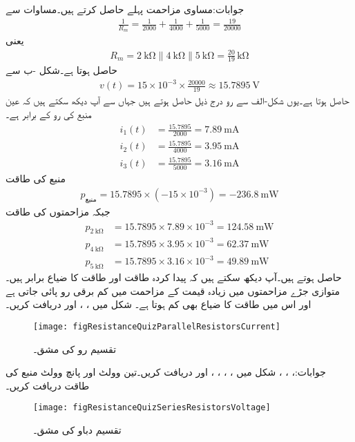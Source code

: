 جوابات:مساوی مزاحمت پہلے حاصل کرتے ہیں۔مساوات  سے
\begin{align*}
\frac{1}{R_m}=\frac{1}{2000}+\frac{1}{4000}+\frac{1}{5000}=\frac{19}{20000}
\end{align*}
یعنی
\begin{align*}
R_m=\SI{2}{\kilo\ohm} \parallel \SI{4}{\kilo\ohm} \parallel \SI{5}{\kilo\ohm}=\frac{20}{19} \, \si{\kilo\ohm}
\end{align*}
حاصل ہوتا ہے۔شکل -ب سے 
\begin{align*}
v(t)=15 \times 10^{-3} \times \frac{20000}{19} \approx \SI{15.7895}{\volt}
\end{align*}
حاصل ہوتا ہے۔یوں شکل-الف سے رو درج ذیل حاصل ہوتے ہیں جہاں سے آپ دیکھ سکتے ہیں کہ  عین منبع کی رو کے برابر ہے۔
\begin{align*}
i_1(t)&=\frac{15.7895}{2000}=\SI{7.89}{\milli\ampere}\\
i_2(t)&=\frac{15.7895}{4000}=\SI{3.95}{\milli\ampere}\\
i_3(t)&=\frac{15.7895}{5000}=\SI{3.16}{\milli\ampere}
\end{align*}
منبع کی طاقت
\begin{align*}
p_{\text{منبع}}=15.7895 \times (-15\times 10^{-3})=\SI{-236.8}{\milli\watt}
\end{align*}
جبکہ مزاحمتوں کی طاقت
\begin{align*}
p_{\SI{2}{\kilo\ohm}}&=15.7895\times 7.89\times 10^{-3}=\SI{124.58}{\milli\watt}\\
p_{\SI{4}{\kilo\ohm}}&=15.7895\times 3.95\times 10^{-3}=\SI{62.37}{\milli\watt}\\
p_{\SI{5}{\kilo\ohm}}&=15.7895\times 3.16\times 10^{-3}=\SI{49.89}{\milli\watt}
\end{align*}
حاصل ہوتے ہیں۔آپ دیکھ سکتے ہیں کہ پیدا کردہ طاقت اور طاقت کا ضیاع برابر ہیں۔متوازی جڑے مزاحمتوں میں زیادہ قیمت کے مزاحمت میں کم برقی رو پائی جاتی ہے اور اس میں طاقت کا ضیاع بھی کم ہوتا ہے۔
\FloatBarrier
شکل  میں ، ،  اور  دریافت کریں۔
\begin{figure}
\centering
\texttt{[image: figResistanceQuizParallelResistorsCurrent]}
\caption{تقسیم رو کی مشق۔}
\label{مشق_مزاحمتی_تقسیم_رو_مشق}
\end{figure}

جوابات:، ، ، 
\FloatBarrier
شکل  میں ، ، ، ،  اور  دریافت کریں۔تین وولٹ اور پانچ وولٹ منبع کی طاقت دریافت کریں۔
\begin{figure}
\centering
\texttt{[image: figResistanceQuizSeriesResistorsVoltage]}
\caption{تقسیم دباو کی مشق۔}
\label{مشق_مزاحمتی_تقسیم_دباو_مشق}
\end{figure}

